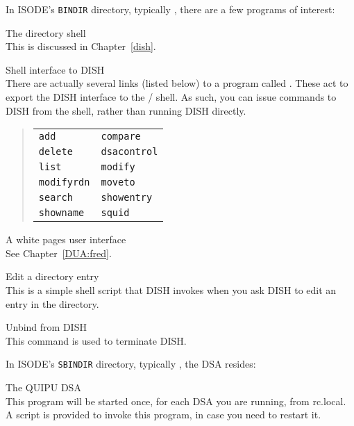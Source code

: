 In ISODE's \verb"BINDIR" directory,
typically ,
there are a few programs of interest:
\begin{describe}
\item[\verb+dish+:]	The directory shell\\
		This is discussed in Chapter~\ref{dish}.

\item[\verb+bind+:]	Shell interface to DISH\\
		There are actually several links (listed below) to a program called
		.
		These act to export the DISH interface to the \unix/
		shell.
		As such,
		you can issue commands to DISH from the shell,
		rather than running DISH directly.
\begin{quote}
\begin{tabular}{ll}
\verb+add+ &
\verb+compare+\\
\verb+delete+ &
\verb+dsacontrol+\\
\verb+list+ &
\verb+modify+\\
\verb+modifyrdn+ &
\verb+moveto+\\
\verb+search+ &
\verb+showentry+\\
\verb+showname+ &
\verb+squid+
\end{tabular}
\end{quote}

\item[\verb+fred+:]	A white pages user interface\\
		See Chapter~\ref{DUA:fred}.

\item[\verb+editentry+:]	Edit a directory entry\\
		This is a simple shell script that DISH invokes when you
		ask DISH to edit an entry in the directory.

\item[\verb+unbind+:]	Unbind from DISH\\
		This command is used to terminate DISH.
\end{describe}
In ISODE's \verb"SBINDIR" directory,
typically ,
the DSA resides:
\begin{describe}
\item[\verb+ros.quipu+:]	The QUIPU DSA\\
			This program will be started once, for each DSA you
			are running, from rc.local.
			A script is provided to invoke this program,
			in case you need to restart it.

\end{describe}
